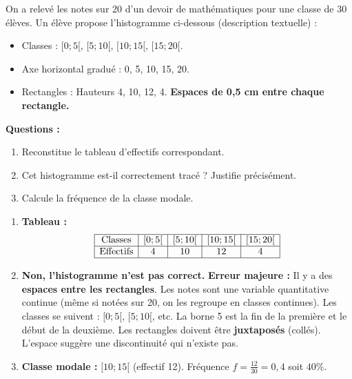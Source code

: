 \documentclass[11pt]{article}
\begin{document}
\begin{exercice}
On a relevé les notes sur 20 d'un devoir de mathématiques pour une classe de 30 élèves. Un élève propose l'histogramme ci-dessous (description textuelle) :
\begin{itemize}
    \item Classes : $[0;5[$, $[5;10[$, $[10;15[$, $[15;20[$.
    \item Axe horizontal gradué : 0, 5, 10, 15, 20.
    \item Rectangles : Hauteurs 4, 10, 12, 4. \textbf{Espaces de 0,5 cm entre chaque rectangle.}
\end{itemize}
\textbf{Questions :}
\begin{enumerate}
    \item Reconstitue le tableau d'effectifs correspondant.
    \item Cet histogramme est-il correctement tracé ? Justifie précisément.
    \item Calcule la fréquence de la classe modale.
\end{enumerate}
\end{exercice}

\begin{corrige}[Exercice 2]
\begin{enumerate}
    \item \textbf{Tableau :}
    \[
    \begin{array}{|c|c|c|c|c|}\hline
    \text{Classes} & [0;5[ & [5;10[ & [10;15[ & [15;20[ \\ \hline
    \text{Effectifs} & 4 & 10 & 12 & 4 \\ \hline
    \end{array}
    \]
    \item \textbf{Non, l'histogramme n'est pas correct.}
    \textbf{Erreur majeure :} Il y a des \textbf{espaces entre les rectangles}. Les notes sont une variable quantitative continue (même si notées sur 20, on les regroupe en classes continues). Les classes se suivent : $[0;5[$, $[5;10[$, etc. La borne 5 est la fin de la première et le début de la deuxième. Les rectangles doivent être \textbf{juxtaposés} (collés). L'espace suggère une discontinuité qui n'existe pas.
    \item \textbf{Classe modale :} $[10;15[$ (effectif 12). Fréquence $f = \frac{12}{30} = 0,4$ soit $40\%$.
\end{enumerate}
\end{corrige}
\end{document}
